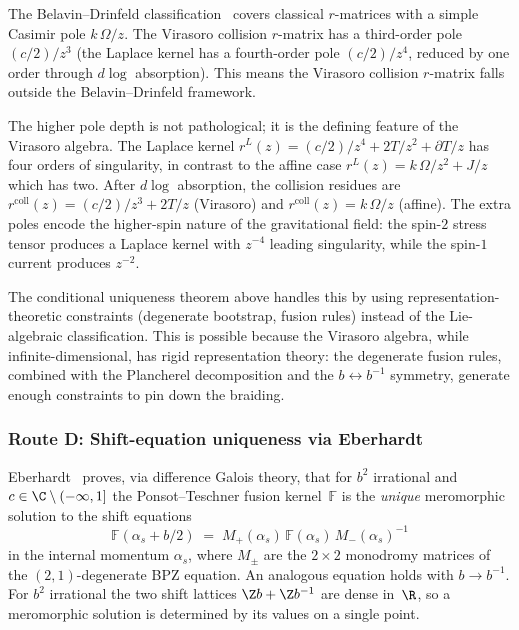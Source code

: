 \begin{remark}
\label{rem:BD-gap}
The Belavin--Drinfeld classification~\cite{BelavinDrinfeld} covers
classical $r$-matrices with a simple Casimir pole
$k\,\Omega/z$. The Virasoro collision $r$-matrix has a
third-order pole $(c/2)/z^3$
(the Laplace kernel has a fourth-order pole $(c/2)/z^4$, reduced
by one order through $d\log$ absorption).
This means the Virasoro collision $r$-matrix falls outside the
Belavin--Drinfeld framework.

The higher pole depth is not pathological; it is the defining
feature of the Virasoro algebra. The Laplace kernel
$r^L(z) = (c/2)/z^4 + 2T/z^2 + \partial T/z$ has four
orders of singularity, in contrast to the affine case
$r^L(z) = k\,\Omega/z^2 + J/z$ which has two.
After $d\log$ absorption, the collision residues are
$r^{\mathrm{coll}}(z) = (c/2)/z^3 + 2T/z$ (Virasoro) and
$r^{\mathrm{coll}}(z) = k\,\Omega/z$ (affine).
The extra poles encode the higher-spin nature of the gravitational
field: the spin-$2$ stress tensor produces a Laplace kernel with
$z^{-4}$ leading singularity, while the spin-$1$ current produces
$z^{-2}$.

The conditional uniqueness theorem above handles this by using
representation-theoretic constraints (degenerate bootstrap, fusion
rules) instead of the Lie-algebraic classification. This is
possible because the Virasoro algebra, while infinite-dimensional,
has rigid representation theory: the degenerate
fusion rules, combined with the Plancherel decomposition and
the $b \leftrightarrow b^{-1}$ symmetry, generate enough
constraints to pin down the braiding.
\end{remark}

\subsubsection{Route D: Shift-equation uniqueness via Eberhardt}
\label{subsubsec:route-D-eberhardt}

Eberhardt~\cite{Eberhardt23} proves, via difference Galois theory,
that for $b^2$ irrational and $c \in \C \setminus (-\infty, 1]$
the Ponsot--Teschner fusion kernel~$\mathbb{F}$ is the
\emph{unique} meromorphic solution to the shift equations
\begin{equation}\label{eq:shift-equations}
\mathbb{F}(\alpha_s + b/2) \;=\;
M_+(\alpha_s)\,\mathbb{F}(\alpha_s)\,M_-(\alpha_s)^{-1}
\end{equation}
in the internal momentum $\alpha_s$, where $M_\pm$ are the
$2 \times 2$ monodromy matrices of the $(2,1)$-degenerate
BPZ equation. An analogous equation holds with $b \to b^{-1}$.
For $b^2$ irrational the two shift lattices $\Z b + \Z b^{-1}$
are dense in~$\R$, so a meromorphic solution is determined by
its values on a single point.

